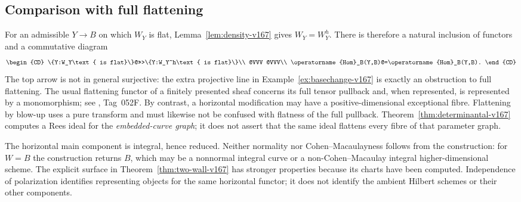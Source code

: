 \subsection{Comparison with full flattening}
For an admissible $Y\to B$ on which $W_Y$ is flat,
Lemma~\ref{lem:density-v167} gives $W_Y=W_Y^h$. There is therefore
a natural inclusion of functors and a commutative diagram
\[
\begin{CD}
 \{Y:W_Y\text{ is flat}\}@>>>\{Y:W_Y^h\text{ is flat}\}\\
 @VVV @VVV\\
 \operatorname{Hom}_B(Y,B)@=\operatorname{Hom}_B(Y,B).
\end{CD}
\]
The top arrow is not in general surjective: the extra projective
line in Example~\ref{ex:basechange-v167} is exactly an obstruction
to full flattening. The usual flattening functor of a finitely
presented sheaf concerns its full tensor pullback and, when
represented, is represented by a monomorphism; see
\cite{Stacks166}, Tag~052F. By contrast, a horizontal modification
may have a positive-dimensional exceptional fibre. Flattening by
blow-up uses a pure transform and must likewise not be confused
with flatness of the full pullback. Theorem~\ref{thm:determinantal-v167}
computes a Rees ideal for the \emph{embedded-curve graph}; it does
not assert that the same ideal flattens every fibre of that
parameter graph.

The horizontal main component is integral, hence reduced. Neither
normality nor Cohen--Macaulayness follows from the construction:
for $W=B$ the construction returns $B$, which may be a nonnormal
integral curve or a non-Cohen--Macaulay integral higher-dimensional
scheme. The explicit surface in Theorem~\ref{thm:two-wall-v167}
has stronger properties because its charts have been computed.
Independence of polarization identifies representing objects for
the same horizontal functor; it does not identify the ambient
Hilbert schemes or their other components.
